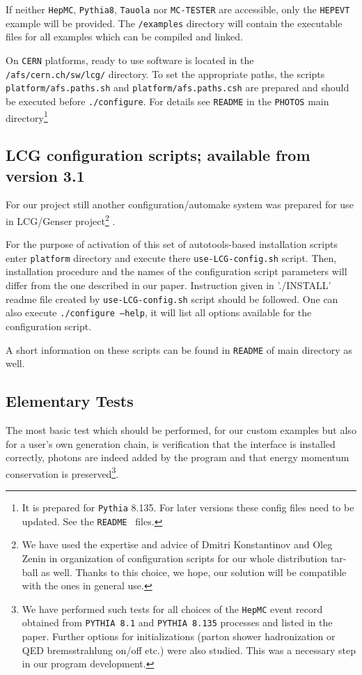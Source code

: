 \documentclass[]{Photos_interface_design}
\begin{document}
If neither {\tt HepMC}, {\tt Pythia8}, {\tt Tauola} nor {\tt MC-TESTER} are accessible, 
only the {\tt HEPEVT} example will be provided. The {\tt /examples} directory will 
contain the executable files for all examples which can be compiled and linked.

On {\tt CERN} platforms, ready to use software is located in the {\tt /afs/cern.ch/sw/lcg/}
directory. To set the appropriate paths, the scripts 
{\tt platform/afs.paths.sh} and {\tt platform/afs.paths.csh} are prepared and should be executed before
{\tt ./configure}. For details see {\tt README} in the {\tt PHOTOS} main directory\footnote { It is prepared for {\tt  Pythia} 8.135. For later  versions
these config files need to be updated. See the {\tt README } files.}

\subsection{ LCG configuration scripts; available from version 3.1%
}
\label{sec:autotools}

For our project still another configuration/automake system was prepared
for use in LCG/Genser project\footnote{We have used the expertise and advice
of Dmitri Konstantinov and Oleg Zenin in organization of configuration scripts
for our whole distribution tar-ball as well. Thanks to this choice, we hope, our solution
 will be compatible with the ones in general use.} \cite{LCG,Kirsanov:2008zz}.

For the purpose of activation of this set of autotools\cite{autotools}-based installation scripts
enter {\tt platform} directory and execute there {\tt use-LCG-config.sh} script.
Then, installation procedure and the names of the configuration script parameters will differ from the one 
described in our paper. Instruction given in  './INSTALL' readme file created by {\tt use-LCG-config.sh} script
should be followed. One can also execute {\tt ./configure --help}, it will 
list all options available for the configuration script.

A short information on these scripts can be found in {\tt README} of main directory as well.

\subsection{Elementary Tests}
\label{sect:elem}

The most basic test which should be performed, for our custom examples but also for a user's own generation chain, 
 is verification that the interface is installed correctly, 
photons are indeed added by the program and that energy momentum 
conservation is preserved\footnote{
We have  performed such  tests for all choices of the {\tt HepMC} event record obtained 
from  {\tt PYTHIA 8.1} and {\tt PYTHIA 8.135} processes and 
listed in the paper. Further  options for initializations 
(parton shower hadronization or QED bremsstrahlung on/off etc.) were also studied.
This was a necessary step in our program development.}.
\end{document}
